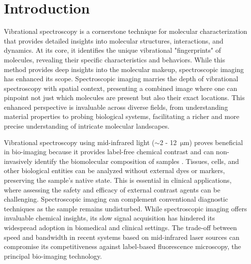 \documentclass{optica-article}
\begin{document}

\section{Introduction}
Vibrational spectroscopy is a cornerstone technique for molecular characterization that provides detailed insights into molecular structures, interactions, and dynamics. At its core, it identifies the unique vibrational "fingerprints" of molecules, revealing their specific characteristics and behaviors. While this method provides deep insights into the molecular makeup, spectroscopic imaging has enhanced its scope. Spectroscopic imaging marries the depth of vibrational spectroscopy with spatial context, presenting a combined image where one can pinpoint not just which molecules are present but also their exact locations. This enhanced perspective is invaluable across diverse fields, from understanding material properties to probing biological systems, facilitating a richer and more precise understanding of intricate molecular landscapes.

Vibrational spectroscopy using mid-infrared light ($\sim$2 - \mbox{12 $\mathrm{\mu m}$}) proves beneficial in bio-imaging because it provides label-free chemical contrast and can non-invasively identify the biomolecular composition of samples \cite{bakerUsingFourierTransform2014}. Tissues, cells, and other biological entities can be analyzed without external dyes or markers, preserving the sample's native state. This is essential in clinical applications, where assessing the safety and efficacy of external contrast agents can be challenging. Spectroscopic imaging can complement conventional diagnostic techniques as the sample remains undisturbed. While spectroscopic imaging offers invaluable chemical insights, its slow signal acquisition has hindered its widespread adoption in biomedical and clinical settings. The trade-off between speed and bandwidth in recent systems \cite{zhangDepthresolvedMidinfraredPhotothermal2016,koleDiscreteFrequencyInfrared2012,yehFastInfraredChemical2015}  based on mid-infrared laser sources can compromise its competitiveness against label-based fluorescence microscopy, the principal bio-imaging technology.
\end{document}
